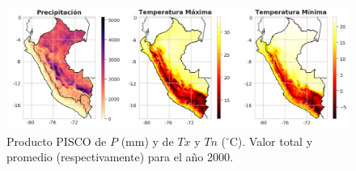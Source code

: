 \vspace{1cm} %
\begin{figure}[ht]
	\includegraphics[width=16cm]{Images/00_PISCOproducts.png}
	\centering
	\caption{Producto PISCO de $P$ (mm) y de $Tx$ y $Tn$ ($^{\circ}$C). Valor total y promedio (respectivamente) para el año 2000.}
	\label{fig:00_PISCOproducts}
\end{figure}